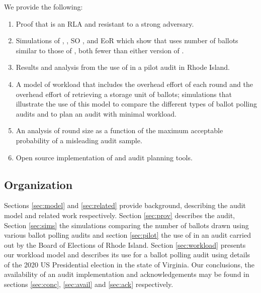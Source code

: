 We provide the following:
\begin{enumerate}
\item Proof that \Providence is an RLA and resistant to a strong adversary.
\item Simulations of \Providence, \Minerva, SO \BRAVO, and EoR \BRAVO which show that \Providence uses number of ballots similar to those of \Minerva, both fewer than either version of \BRAVO.
\item Results and analysis from the use of \Providence in a pilot audit in Rhode Island.
\item A model of workload that includes the overhead effort of each round and the overhead effort of retrieving a storage unit of ballots; simulations that illustrate the use of this model to compare the different types of ballot polling audits and to plan an audit with minimal workload.
\item An analysis of round size as a function of the maximum acceptable probability of a misleading audit sample.
\item Open source implementation of \Providence and audit planning tools. 
\end{enumerate}


\subsection{Organization} 
Sections \ref{sec:model} and \ref{sec:related} provide background, describing the audit model and related work respectively. Section \ref{sec:prov} describes the \Providence audit, Section \ref{sec:sims} the simulations comparing the number of ballots drawn using various ballot polling audits and section \ref{sec:pilot} the use of \Providence in an audit carried out by the Board of Elections of Rhode Island. Section \ref{sec:workload} presents our workload model and describes its use for a ballot polling audit using details of the 2020 US Presidential election in the state of Virginia. Our conclusions, the availability of an audit implementation and acknowledgements may be found in sections \ref{sec:conc}, \ref{sec:avail} and \ref{sec:ack} respectively. 

